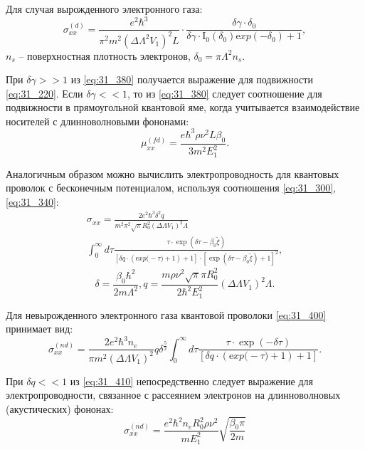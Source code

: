 Для случая вырожденного электронного газа:
\begin{equation} \label{eq:31_380}
\sigma _{xx}^{(d)} =\frac{e^{2} \hbar ^{3} }{\pi ^{2} m^{2} \left(\Delta \Lambda ^{2} V_{1} \right)^{2} L} \cdot \frac{\delta \gamma \cdot \delta _{0} }{\delta \gamma \cdot {\mathrm I}_{{\mathrm 0}} \left(\delta _{0} \right){\mathrm exp}(-\delta _{0} )+1} ,
\end{equation}
$n_{s} $ -- поверхностная плотность электронов, $\delta _{0} =\pi \Lambda ^{2} n_{s} $.

При $\delta \gamma >>1$ из \eqref{eq:31_380} получается выражение для подвижности \eqref{eq:31_220}. Если $\delta \gamma <<1$, то из \eqref{eq:31_380} следует соотношение для подвижности в прямоугольной квантовой яме, когда учитывается взаимодействие носителей с длинноволновыми фононами:
\begin{equation} \label{eq:31_390}
\mu _{xx}^{(fd)} =\frac{e\hbar ^{3} \rho \nu ^{2} L\beta _{0} }{3m^{2} E_{1}^{2} }. 
\end{equation}
 
Аналогичным образом можно вычислить электропроводность для квантовых проволок с бесконечным потенциалом, используя соотношения \eqref{eq:31_300}, \eqref{eq:31_340}:
\begin{multline} \label{eq:31_400}
\sigma _{xx} =\frac{2e^{2} \hbar ^{3} \delta ^{2} q}{m^{2} \pi ^{2} \sqrt{\pi } R_{0}^{2} \left(\Delta \Lambda V_{1} \right)^{2} \Lambda } \\
\int _{0}^{\infty }d\tau \frac{\tau \cdot {\exp}\left(\delta \tau -\beta _{0} \tilde{\xi }\right)}{\left[\delta q\cdot \left({\mathrm exp(}-\tau )+1\right)+1\right]\cdot \left[{\exp}\left(\delta \tau -\beta _{0} \tilde{\xi }\right)+1\right]^{2} }, 
\end{multline}
\[\delta =\frac{\beta _{0} \hbar ^{2} }{2m\Lambda ^{2} } , q=\frac{m\rho \nu ^{2} \sqrt{\pi } \pi R_{0}^{2} }{2\hbar ^{2} E_{1}^{2} } \left(\Delta \Lambda V_{1} \right)^{2} \Lambda .\] 

Для невырожденного электронного газа квантовой проволоки \eqref{eq:31_400} принимает вид:
\begin{equation} \label{eq:31_410}
\sigma _{xx}^{(nd)} =\frac{2e^{2} \hbar ^{3} n_{e} }{\pi m^{2} \left(\Delta \Lambda V_{1} \right)^{2} } q\delta ^{\frac{5}{2} } \int _{0}^{\infty }d\tau \frac{\tau \cdot \exp (-\delta \tau )}{\left[\delta q\cdot \left({\mathrm exp(}-\tau )+1\right)+1\right]}. 
 \end{equation}

При $\delta q<<1$ из \eqref{eq:31_410} непосредственно следует выражение для электропроводности, связанное с рассеянием электронов на длинноволновых (акустических) фононах:
\begin{equation} \label{eq:31_420}
\sigma _{xx}^{(nd)} =\frac{e^{2} \hbar ^{2} n_{e} R_{0}^{2} \rho \nu ^{2} }{mE_{1}^{2} } \sqrt{\frac{\beta _{0} \pi }{2m} }
\end{equation}

